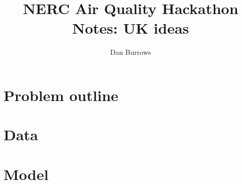 \documentclass[11pt, a4paper]{article}
\title{NERC Air Quality Hackathon Notes: UK ideas}
\author{Dan Burrows}
\numberwithin{equation}{section}
\begin{document}
\maketitle

\section{Problem outline}


\section{Data}


\section{Model}

\end{document}
